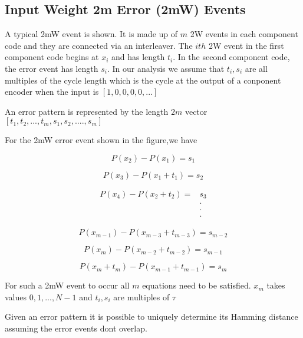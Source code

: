 \documentclass[11pt, oneside, dvipdfmx]{book}
\begin{document}
\subsection{Input Weight 2m Error (2mW) Events}
A typical 2mW event is shown. It is made up of $m$ 2W events in each component code and they are connected via an interleaver. The $ith$ 2W event in the first component code begins at $x_i$ and has length $t_i$. In the second component code, the error event has length $s_i$. In our analysis we assume that $t_i,s_i$ are all multiples of the cycle length which is the cycle at the output of a conponent encoder when the input is $[1,0,0,0,0,...]$

An error pattern is represented by the length $2m$ vector $[t_1,t_2,...,t_m,s_1,s_2,....,s_m]$

For the 2mW error event shown in the figure,we have 

\begin{equation}
P(x_2)-P(x_1) = s_1
\end{equation}

\begin{equation}
P(x_3)-P(x_1+t_1) = s_2
\end{equation}

\begin{equation}
\begin{split}
P(x_4)-P(x_2+t_2) =& s_3\\
&\cdot\\
&\cdot\\
&\cdot
\end{split}
\end{equation}

\begin{equation}
P(x_{m-1})-P(x_{m-3}+t_{m-3}) = s_{m-2}
\end{equation}

\begin{equation}
P(x_{m})-P(x_{m-2}+t_{m-2}) = s_{m-1}
\end{equation}

\begin{equation}
P(x_{m}+t_m)-P(x_{m-1}+t_{m-1}) = s_{m}
\end{equation}

For such a 2mW event to occur all $m$ equations need to be satisfied. $x_m$ takes values  $0,1,...,N-1$ and $t_i,s_i$ are multiples of $\tau$

Given an error pattern it is possible to uniquely determine its Hamming distance assuming the error events dont overlap.
\end{document}
